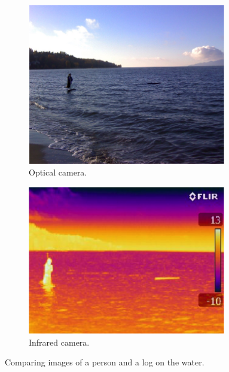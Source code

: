 \begin{figure}[h]
\centering
\begin{subfigure}{0.45\textwidth}
 \centering
 \includegraphics[width=0.95\textwidth]{"./image/person_normal"}
 \caption{Optical camera.}
 \label{fig:person_ex:sub1}
\end{subfigure}
\begin{subfigure}{0.45\textwidth}
 \centering
 \includegraphics[width=0.95\textwidth]{"./image/person_ir"}
 \caption{Infrared camera.}
 \label{fig:person_ex:sub2}
\end{subfigure}
\caption{Comparing images of a person and a log on the water.}
\label{fig:person_ex}
\end{figure}

